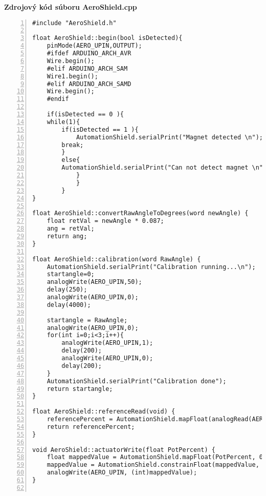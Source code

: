 \LARGE\bf{Zdrojový kód súboru AeroShield.cpp}
\label{AeroShield.cpp}
\vspace{1cm}
\begin{lstlisting}[numbers=left,basicstyle=\tiny,caption={Zdrojový kód súboru AeroShield.cpp.},captionpos=b]	
#include "AeroShield.h"     
	
float AeroShield::begin(bool isDetected){   
	pinMode(AERO_UPIN,OUTPUT);  		   
	#ifdef ARDUINO_ARCH_AVR      
	Wire.begin();                            
	#elif ARDUINO_ARCH_SAM                            
	Wire1.begin();                
	#elif ARDUINO_ARCH_SAMD         
	Wire.begin();                            
	#endif
		
	if(isDetected == 0 ){                
	while(1){                                    
		if(isDetected == 1 ){                          
			AutomationShield.serialPrint("Magnet detected \n");
		break;
		}
		else{                                                 
		AutomationShield.serialPrint("Can not detect magnet \n"); 
			}
			}
		}       
} 

float AeroShield::convertRawAngleToDegrees(word newAngle) {
	float retVal = newAngle * 0.087;      
	ang = retVal;                               
	return ang;                  
}

float AeroShield::calibration(word RawAngle) {      
	AutomationShield.serialPrint("Calibration running...\n");  
	startangle=0;                                
	analogWrite(AERO_UPIN,50);              
	delay(250);                              
	analogWrite(AERO_UPIN,0);              
	delay(4000);    
	                       
	startangle = RawAngle;                                 
	analogWrite(AERO_UPIN,0);                     
	for(int i=0;i<3;i++){                  
		analogWrite(AERO_UPIN,1);                 
		delay(200);                           
		analogWrite(AERO_UPIN,0);                                
		delay(200);                                     
	}
	AutomationShield.serialPrint("Calibration done");
	return startangle;                                         
}
	
float AeroShield::referenceRead(void) {                                                
	referencePercent = AutomationShield.mapFloat(analogRead(AERO_RPIN), 0.0, 1024.0, 0.0, 100.0);   
	return referencePercent;                                     
}
	
void AeroShield::actuatorWrite(float PotPercent) {       
	float mappedValue = AutomationShield.mapFloat(PotPercent, 0.0, 100.0, 0.0, 255.0);  
	mappedValue = AutomationShield.constrainFloat(mappedValue, 0.0, 255.0);
	analogWrite(AERO_UPIN, (int)mappedValue);    
}
	

\end{lstlisting}
